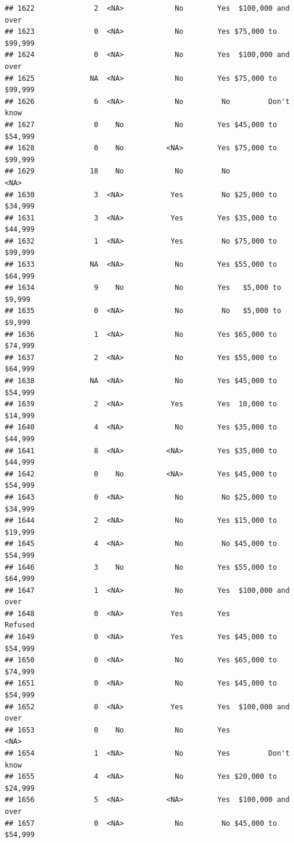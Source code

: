 \documentclass[man]{apa6}
\begin{document}
\begin{verbatim}
## 1622              2  <NA>            No        Yes  $100,000 and over
## 1623              0  <NA>            No        Yes $75,000 to $99,999
## 1624              0  <NA>            No        Yes  $100,000 and over
## 1625             NA  <NA>            No        Yes $75,000 to $99,999
## 1626              6  <NA>            No         No         Don't know
## 1627              0    No            No        Yes $45,000 to $54,999
## 1628              0    No          <NA>        Yes $75,000 to $99,999
## 1629             18    No            No         No               <NA>
## 1630              3  <NA>           Yes         No $25,000 to $34,999
## 1631              3  <NA>           Yes        Yes $35,000 to $44,999
## 1632              1  <NA>           Yes         No $75,000 to $99,999
## 1633             NA  <NA>            No        Yes $55,000 to $64,999
## 1634              9    No            No        Yes   $5,000 to $9,999
## 1635              0  <NA>            No         No   $5,000 to $9,999
## 1636              1  <NA>            No        Yes $65,000 to $74,999
## 1637              2  <NA>            No        Yes $55,000 to $64,999
## 1638             NA  <NA>            No        Yes $45,000 to $54,999
## 1639              2  <NA>           Yes        Yes  10,000 to $14,999
## 1640              4  <NA>            No        Yes $35,000 to $44,999
## 1641              8  <NA>          <NA>        Yes $35,000 to $44,999
## 1642              0    No          <NA>        Yes $45,000 to $54,999
## 1643              0  <NA>            No         No $25,000 to $34,999
## 1644              2  <NA>            No        Yes $15,000 to $19,999
## 1645              4  <NA>            No         No $45,000 to $54,999
## 1646              3    No            No        Yes $55,000 to $64,999
## 1647              1  <NA>            No        Yes  $100,000 and over
## 1648              0  <NA>           Yes        Yes            Refused
## 1649              0  <NA>           Yes        Yes $45,000 to $54,999
## 1650              0  <NA>            No        Yes $65,000 to $74,999
## 1651              0  <NA>            No        Yes $45,000 to $54,999
## 1652              0  <NA>           Yes        Yes  $100,000 and over
## 1653              0    No            No        Yes               <NA>
## 1654              1  <NA>            No        Yes         Don't know
## 1655              4  <NA>            No        Yes $20,000 to $24,999
## 1656              5  <NA>          <NA>        Yes  $100,000 and over
## 1657              0  <NA>            No         No $45,000 to $54,999

\end{verbatim}
\end{document}
